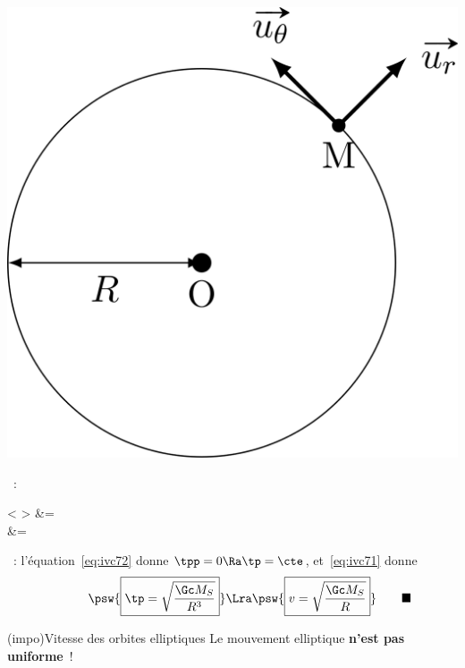 \documentclass[../../main/main.tex]{subfiles}
\begin{document}
\begin{tcb*}
\begin{minipage}[t]{0.25\linewidth}
\begin{center}
{			}{
				\includegraphics[width=\linewidth]{kepler_3_circ}
			}
		\end{center}
	\end{minipage}
	\begin{enumerate}[label=\sqenumi, start=5]
		~:
		\begin{DispWithArrows}<  \Lra >
			 &= 
			\label{eq:ivc71}
			\\
			 &= 
			\label{eq:ivc72}
		\end{DispWithArrows}
		~:
		l'équation~\eqref{eq:ivc72} donne $\tpp = 0 \Ra \tp = \cte$,
		et~\eqref{eq:ivc71} donne
		\begin{equation}
			\psw{\boxed{\tp = \sqrt{\frac{\Gc M_S}{R^3}}}}
			\Lra
			\psw{\boxed{v = \sqrt{\frac{\Gc M_S}{R}}}}
			\rlap{$\qquad\blacksquare$}
			\label{eq:ivc73}
		\end{equation}
	\end{enumerate}
\end{tcb*}

\begin{tcb*}(impo){Vitesse des orbites elliptiques}
	Le mouvement elliptique \textbf{n'est pas uniforme}~!
\end{tcb*}
\end{document}
